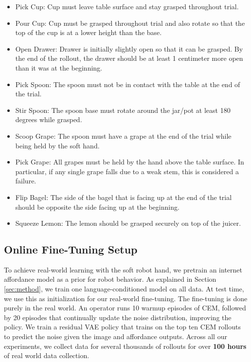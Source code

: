 \begin{itemize}
    \item Pick Cup: Cup must leave table surface and stay grasped throughout trial.
    \item Pour Cup: Cup must be grasped throughout trial and also rotate so that the top of the cup is at a lower height than the base.
    \item Open Drawer: Drawer is initially slightly open so that it can be grasped. By the end of the rollout, the drawer should be at least 1 centimeter more open than it was at the beginning.
    \item Pick Spoon: The spoon must not be in contact with the table at the end of the trial.
    \item Stir Spoon: The spoon base must rotate around the jar/pot at least 180 degrees while grasped.
    \item Scoop Grape: The spoon must have a grape at the end of the trial while being held by the soft hand.
    \item Pick Grape: All grapes must be held by the hand above the table surface. In particular, if any single grape falls due to a weak stem, this is considered a failure.
    \item Flip Bagel: The side of the bagel that is facing up at the end of the trial should be opposite the side facing up at the beginning.
    \item Squeeze Lemon: The lemon should be grasped securely on top of the juicer.
\end{itemize}

\subsection{Online Fine-Tuning Setup}

To achieve real-world learning with the soft robot hand, we pretrain an internet affordance model as a prior for robot behavior.  As explained in Section \ref{sec:method}, we train one language-conditioned model on all data.  At test time, we use this as initialization for our real-world fine-tuning. The fine-tuning is done purely in the real world.  An operator runs 10 warmup episodes of CEM, followed by 20 episodes that continually update the noise distribution, improving the policy. We train a residual VAE policy that trains on the top ten CEM rollouts to predict the noise given the image and affordance outputs. Across all our experiments, we collect data for several thousands of rollouts for over \textbf{100 hours} of real world data collection.

